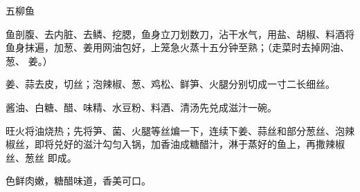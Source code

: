 %
%
%
%
%
%
%
\begin{recipe}{五柳鱼}

\ingredients


\preparation

\step 鱼剖腹、去内脏、去鳞、挖腮，鱼身立刀划数刀，沾干水气，用盐、胡椒、料酒将
鱼身抹遍，加葱、姜用网油包好，上笼急火蒸十五分钟至熟；（走菜时去掉网油、葱、
姜。）

\step 姜、蒜去皮，切丝；泡辣椒、葱、鸡松、鲜笋、火腿分别切成一寸二长细丝。

\step 酱油、白糖、醋、味精、水豆粉、料酒、清汤先兑成滋汁一碗。

\step 旺火将油烧热；先将笋、菌、火腿等丝煸一下，连续下姜、蒜丝和部分葱丝、泡辣
椒丝，即将兑好的滋汁勾匀入锅，加香油成糖醋汁，淋于蒸好的鱼上，再撒辣椒丝、葱丝
即成。

\features

色鲜肉嫩，糖醋味道，香美可口。

\end{recipe}

